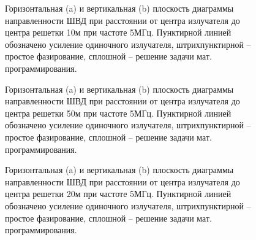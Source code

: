 \begin{figure}
\begin{minipage}[h]{0.49\linewidth}
\end{minipage}
\hfill
\begin{minipage}[h]{0.49\linewidth}
\end{minipage}
\caption{Горизонтальная (a) и вертикальная (b) плоскость диаграммы направленности ШВД при расстоянии от центра излучателя до центра решетки 10м при частоте 5МГц. Пунктирной линией обозначено усиление одиночного излучателя, штрихпунктирной -- простое фазирование, сплошной -- решение задачи мат. программирования.}
\label{ris:bvd_mut_5_10}
\end{figure}

\begin{figure}
\begin{minipage}[h]{0.49\linewidth}
\end{minipage}
\hfill
\begin{minipage}[h]{0.49\linewidth}
\end{minipage}
\caption{Горизонтальная (a) и вертикальная (b) плоскость диаграммы направленности ШВД при расстоянии от центра излучателя до центра решетки 50м при частоте 5МГц. Пунктирной линией обозначено усиление одиночного излучателя, штрихпунктирной -- простое фазирование, сплошной -- решение задачи мат. программирования.}
\label{ris:bvd_mut_5_50}
\end{figure}


\begin{figure}
\begin{minipage}[h]{0.49\linewidth}
\end{minipage}
\hfill
\begin{minipage}[h]{0.49\linewidth}
\end{minipage}
\caption{Горизонтальная (a) и вертикальная (b) плоскость диаграммы направленности ШВД при расстоянии от центра излучателя до центра решетки 20м при частоте 5МГц. Пунктирной линией обозначено усиление одиночного излучателя, штрихпунктирной -- простое фазирование, сплошной -- решение задачи мат. программирования.}
\label{ris:bvd_mut_5_20}
\end{figure}

